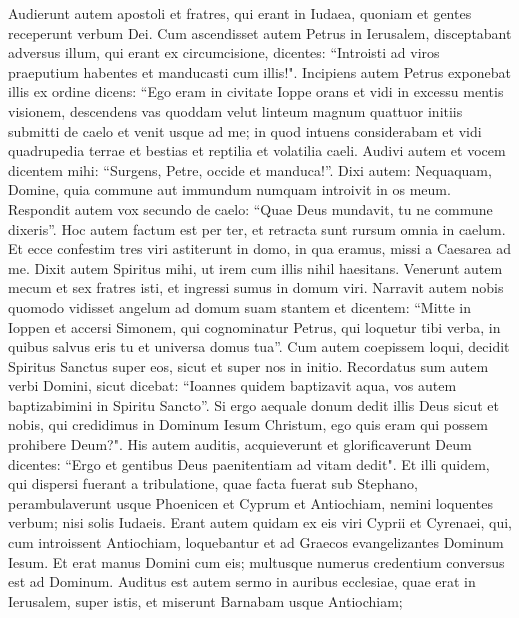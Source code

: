 \begin{biblechapter}  
\verse Audierunt autem apostoli et fratres, qui erant in Iudaea, quoniam et gentes receperunt verbum Dei. 
\verse Cum ascendisset autem Petrus in Ierusalem, disceptabant adversus illum, qui erant ex circumcisione, 
\verse dicentes: “Introisti ad viros praeputium habentes et manducasti cum illis!". 
\verse Incipiens autem Petrus exponebat illis ex ordine dicens: 
\verse “Ego eram in civitate Ioppe orans et vidi in excessu mentis visionem, descendens vas quoddam velut linteum magnum quattuor initiis submitti de caelo et venit usque ad me;  
\verse in quod intuens considerabam et vidi quadrupedia terrae et bestias et reptilia et volatilia caeli. 
\verse Audivi autem et vocem dicentem mihi: “Surgens, Petre, occide et manduca!”. 
\verse Dixi autem: Nequaquam, Domine, quia commune aut immundum numquam introivit in os meum. 
\verse Respondit autem vox secundo de caelo: “Quae Deus mundavit, tu ne commune dixeris”. 
\verse Hoc autem factum est per ter, et retracta sunt rursum omnia in caelum. 
\verse Et ecce confestim tres viri astiterunt in domo, in qua eramus, missi a Caesarea ad me. 
\verse Dixit autem Spiritus mihi, ut irem cum illis nihil haesitans. Venerunt autem mecum et sex fratres isti, et ingressi sumus in domum viri. 
\verse Narravit autem nobis quomodo vidisset angelum ad domum suam stantem et dicentem: “Mitte in Ioppen et accersi Simonem, qui cognominatur Petrus, 
\verse qui loquetur tibi verba, in quibus salvus eris tu et universa domus tua”. 
\verse Cum autem coepissem loqui, decidit Spiritus Sanctus super eos, sicut et super nos in initio. 
\verse Recordatus sum autem verbi Domini, sicut dicebat: “Ioannes quidem baptizavit aqua, vos autem baptizabimini in Spiritu Sancto”. 
\verse Si ergo aequale donum dedit illis Deus sicut et nobis, qui credidimus in Dominum Iesum Christum, ego quis eram qui possem prohibere Deum?". 
\verse His autem auditis, acquieverunt et glorificaverunt Deum dicentes: “Ergo et gentibus Deus paenitentiam ad vitam dedit". 
\verse Et illi quidem, qui dispersi fuerant a tribulatione, quae facta fuerat sub Stephano, perambulaverunt usque Phoenicen et Cyprum et Antiochiam, nemini loquentes verbum; nisi solis Iudaeis. 
\verse Erant autem quidam ex eis viri Cyprii et Cyrenaei, qui, cum introissent Antiochiam, loquebantur et ad Graecos evangelizantes Dominum Iesum. 
\verse Et erat manus Domini cum eis; multusque numerus credentium conversus est ad Dominum. 
\verse Auditus est autem sermo in auribus ecclesiae, quae erat in Ierusalem, super istis, et miserunt Barnabam usque Antiochiam; 

\end{biblechapter}
